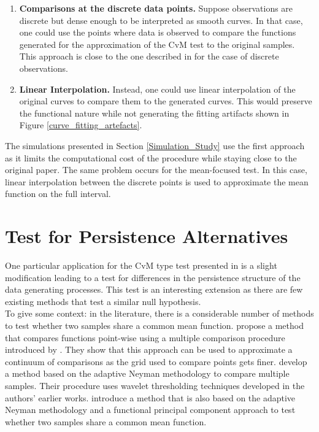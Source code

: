 \documentclass[12pt, a4paper]{article}
\theoremstyle{MAstyle} \newtheorem{assumption}{Assumption}[section]
\theoremstyle{MAstyle} \newtheorem{definition}{Definition}[section]
\theoremstyle{MAstyle} \newtheorem{theorem}{Theorem}[section]
\begin{document}
			\begin{enumerate}
				\item \textbf{Comparisons at the discrete data points.} Suppose observations are discrete but dense enough to be interpreted as smooth curves. In that case, one could use the points where data is observed to compare the functions generated for the approximation of the CvM test to the original samples. This approach is close to the one described in \cite{bugni_permutation_2021} for the case of discrete observations.
				\item \textbf{Linear Interpolation.} Instead, one could use linear interpolation of the original curves to compare them to the generated curves. This would preserve the functional nature while not generating the fitting artifacts shown in Figure \ref{curve_fitting_artefacts}.
			\end{enumerate}
			The simulations presented in Section \ref{Simulation_Study} use the first approach as it limits the computational cost of the procedure while staying close to the original paper. The same problem occurs for the mean-focused test. In this case, linear interpolation between the discrete points is used to approximate the mean function on the full interval.

		
	\section{Test for Persistence Alternatives}\label{variant}
		One particular application for the CvM type test presented in \cite{bugni_permutation_2021} is a slight modification leading to a test for differences in the persistence structure of the data generating processes. This test is an interesting extension as there are few existing methods that test a similar null hypothesis.\\
		
		To give some context: in the literature, there is a considerable number of methods to test whether two samples share a common mean function.
		\cite{cox_pointwise_2008} propose a method that compares functions point-wise using a multiple comparison procedure introduced by \cite{westfall_resampling-based_1993}. They show that this approach can be used to approximate a continuum of comparisons as the grid used to compare points gets finer.
		\cite{fan_test_1998} develop a method based on the adaptive Neyman methodology to compare multiple samples. Their procedure uses wavelet thresholding techniques developed in the authors' earlier works. 
		\cite{lee_two_2015} introduce a method that is also based on the adaptive Neyman methodology and a functional principal component approach to test whether two samples share a common mean function.
		
\end{document}
